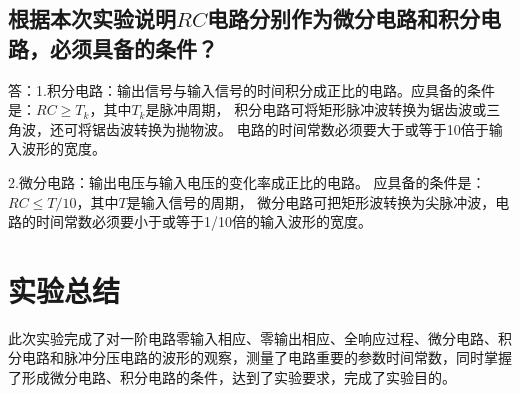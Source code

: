\documentclass[a4paper]{article}
\begin{document}
    \subsection{根据本次实验说明$RC$电路分别作为微分电路和积分电路，必须具备的条件？}\label{subsec:q3}
    \noindent
    {答：1.积分电路：输出信号与输入信号的时间积分成正比的电路。应具备的条件是：$RC \ge T_{k}$，其中$T_{k}$是脉冲周期， 积分电路可将矩形脉冲波转换为锯齿波或三角波，还可将锯齿波转换为抛物波。 电路的时间常数必须要大于或等于10倍于输入波形的宽度。}

    {2.微分电路：输出电压与输入电压的变化率成正比的电路。 应具备的条件是：$RC \le T/10$，其中$T$是输入信号的周期， 微分电路可把矩形波转换为尖脉冲波，电路的时间常数必须要小于或等于1/10倍的输入波形的宽度。}

    \vspace{1cm}


    \section{实验总结}
    {此次实验完成了对一阶电路零输入相应、零输出相应、全响应过程、微分电路、积分电路和脉冲分压电路的波形的观察，测量了电路重要的参数时间常数，同时掌握了形成微分电路、积分电路的条件，达到了实验要求，完成了实验目的。}\label{sec:8}

%    
%    
\end{document}
